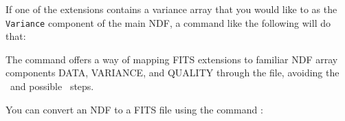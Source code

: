 If one of the extensions contains a variance array that you would like to
as the \texttt{Variance} component of the main NDF, a command like the
following will do that:

\begin{terminalv}
\end{terminalv}

The  command offers a way of mapping FITS extensions to
familiar NDF array components DATA, VARIANCE, and QUALITY
through the  file, avoiding the \ndfcopy\ and possible
\setvar\ steps.

You can convert an NDF to a FITS file using the command
:

\begin{terminalv}
\end{terminalv}




